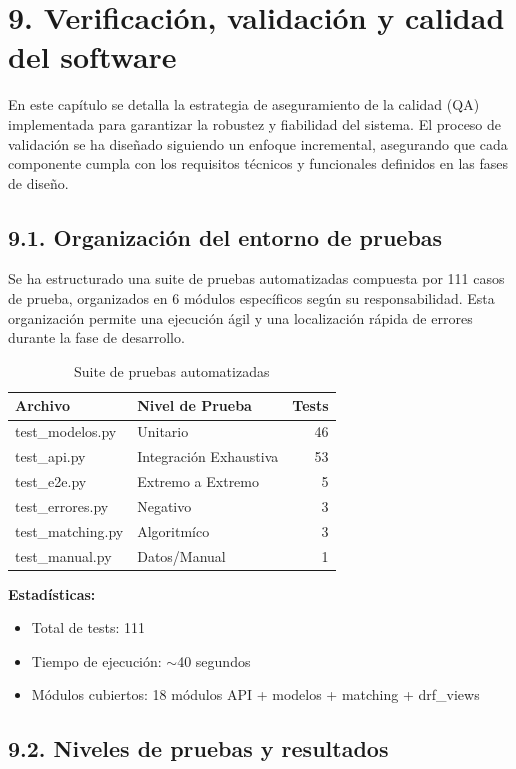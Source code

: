 \section*{9. Verificación, validación y calidad del software}

En este capítulo se detalla la estrategia de aseguramiento de la 
calidad (QA) implementada para garantizar la robustez y fiabilidad 
del sistema. El proceso de validación se ha diseñado siguiendo un 
enfoque incremental, asegurando que cada componente cumpla con los 
requisitos técnicos y funcionales definidos en las fases de diseño.


\subsection{9.1. Organización del entorno de pruebas}

Se ha estructurado una suite de pruebas automatizadas compuesta por 
111 casos de prueba, organizados en 6 módulos específicos según su 
responsabilidad. Esta organización permite una ejecución ágil y una 
localización rápida de errores durante la fase de desarrollo.

\begin{table}[H]
\centering
\small
\begin{tabular}{|l|l|r|}
\hline
\textbf{Archivo} & \textbf{Nivel de Prueba} & 
\textbf{Tests} \\
\hline
test\_modelos.py & Unitario & 46 \\
test\_api.py & Integración Exhaustiva & 53 \\
test\_e2e.py & Extremo a Extremo & 5 \\
test\_errores.py & Negativo & 3 \\
test\_matching.py & Algoritmíco & 3 \\
test\_manual.py & Datos/Manual & 1 \\
\hline
\end{tabular}
\caption{Suite de pruebas automatizadas}
\end{table}

\noindent\textbf{Estadísticas:}
\begin{itemize}
  \item Total de tests: 111
  \item Tiempo de ejecución: $\sim$40 segundos
  \item Módulos cubiertos: 18 módulos API + modelos + matching 
        + drf\_views
\end{itemize}


\subsection{9.2. Niveles de pruebas y resultados}


